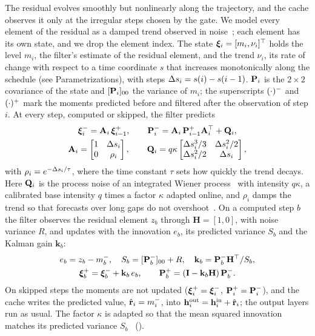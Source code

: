 The residual evolves smoothly but nonlinearly along the trajectory, and the cache observes it only at the irregular
steps chosen by the gate. We model every element of the residual as a damped trend observed in
noise~\cite{gardner1985forecasting,barshalom2001estimation}; each element has its own state, and we drop the element
index. The state $\bm{\xi}_i=[m_i,\nu_i]^\top$ holds the level $m_i$, the filter's estimate of the residual element,
and the trend $\nu_i$, its rate of change with respect to a time coordinate $s$ that increases monotonically along the
schedule (see Parametrizations), with steps $\Delta s_i=s(i)-s(i-1)$. $\mathbf{P}_i$ is the $2\times2$ covariance of the state and
$[\mathbf{P}_i]_{00}$ the variance of $m_i$; the superscripts $(\cdot)^{-}$ and $(\cdot)^{+}$ mark the moments predicted
before and filtered after the observation of step $i$. At every step, computed or skipped, the filter predicts
\begin{gather}
  \bm{\xi}^{-}_i=\mathbf{A}_i\,\bm{\xi}^{+}_{i-1},\qquad
  \mathbf{P}^{-}_i=\mathbf{A}_i\,\mathbf{P}^{+}_{i-1}\mathbf{A}_i^\top+\mathbf{Q}_i,\label{eq:predict}\\
  \mathbf{A}_i=\begin{bmatrix}1&\Delta s_i\\0&\rho_i\end{bmatrix},\qquad
  \mathbf{Q}_i=q\kappa\begin{bmatrix}\Delta s_i^3/3&\Delta s_i^2/2\\\Delta s_i^2/2&\Delta s_i\end{bmatrix},\nonumber
\end{gather}
with $\rho_i=e^{-\Delta s_i/\tau}$, where the time constant $\tau$ sets how quickly the trend decays.
Here $\mathbf{Q}_i$ is the process noise of an integrated Wiener process~\cite{barshalom2001estimation} with intensity $q\kappa$, a calibrated base intensity $q$ times a factor $\kappa$ adapted online,
and $\rho_i$ damps the trend so that forecasts over long gaps do not overshoot~\cite{gardner1985forecasting}. On a
computed step $b$ the filter observes the residual element $z_b$ through $\mathbf H=[1,0]$, with noise variance $R$, and
updates with the innovation $e_b$, its predicted variance $S_b$ and the Kalman gain $\mathbf k_b$:
\begin{gather}
  e_b=z_b-m^{-}_b,\quad S_b=[\mathbf{P}^{-}_b]_{00}+R,\quad \mathbf k_b=\mathbf{P}^{-}_b\mathbf H^\top/S_b,\nonumber\\
  \bm{\xi}^{+}_b=\bm{\xi}^{-}_b+\mathbf k_b\,e_b,\qquad
  \mathbf{P}^{+}_b=(\mathbf I-\mathbf k_b\mathbf H)\,\mathbf{P}^{-}_b.\label{eq:update}
\end{gather}
On skipped steps the moments are not updated ($\bm{\xi}^{+}_i=\bm{\xi}^{-}_i$, $\mathbf{P}^{+}_i=\mathbf{P}^{-}_i$),
and the cache writes the predicted value, $\hat{\mathbf{r}}_i=m^{-}_i$, into $\mathbf{h}^{\mathrm{out}}_i=\mathbf{h}^{\mathrm{in}}_i+\hat{\mathbf{r}}_i$; the output
layers run as usual. The factor $\kappa$ is adapted so that the mean squared innovation matches its
predicted variance $S_b$~\cite{mehra1972approaches} ().

